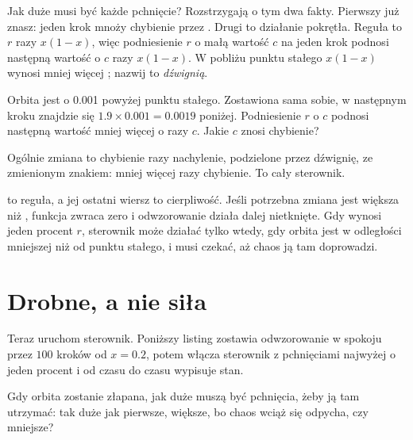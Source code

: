 \noindent
Jak duże musi być każde pchnięcie? Rozstrzygają o tym dwa fakty. Pierwszy
już znasz: jeden krok mnoży chybienie przez . Drugi to
działanie pokrętła. Reguła to $r$ razy $x(1 - x)$, więc podniesienie $r$ o
małą wartość $c$ na jeden krok podnosi następną wartość o $c$ razy
$x(1 - x)$. W pobliżu punktu stałego $x(1 - x)$ wynosi mniej więcej
; nazwij to \emph{dźwignią}.

\begin{think}
Orbita jest o \num{0.001} powyżej punktu stałego. Zostawiona sama sobie, w
następnym kroku znajdzie się $\num{1.9} \times \num{0.001} = \num{0.0019}$
poniżej. Podniesienie $r$ o $c$ podnosi następną wartość mniej więcej o
 razy $c$. Jakie $c$ znosi chybienie?
\end{think}
Ogólnie zmiana to chybienie razy nachylenie, podzielone przez dźwignię, ze
zmienionym znakiem: mniej więcej  razy chybienie. To cały
sterownik.


\noindent
{} to reguła, a jej ostatni wiersz to cierpliwość. Jeśli potrzebna
zmiana jest większa niż , funkcja zwraca zero i odwzorowanie
działa dalej nietknięte. Gdy  wynosi jeden procent $r$,
sterownik może działać tylko wtedy, gdy orbita jest w odległości mniejszej
niż  od punktu stałego, i musi czekać, aż chaos ją tam
doprowadzi.


\section{Drobne, a nie siła}
\label{sec:ch17-small}

\noindent
Teraz uruchom sterownik. Poniższy listing zostawia odwzorowanie w spokoju przez
$100$ kroków od $x = \num{0.2}$, potem włącza sterownik z pchnięciami
najwyżej o jeden procent i od czasu do czasu wypisuje stan.

\begin{think}
Gdy orbita zostanie złapana, jak duże muszą być pchnięcia, żeby ją tam
utrzymać: tak duże jak pierwsze, większe, bo chaos wciąż się odpycha, czy
mniejsze?
\end{think}

